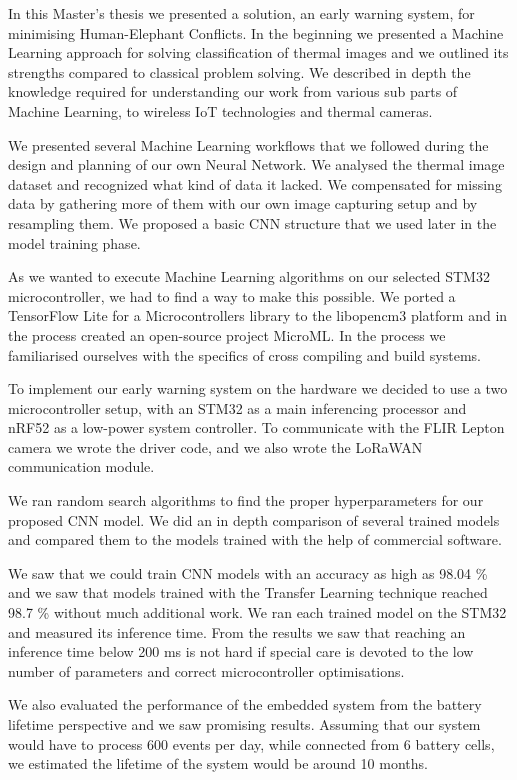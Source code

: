 In this Master's thesis we presented a solution, an early warning system, for minimising Human-Elephant Conflicts.
In the beginning we presented a Machine Learning approach for solving classification of thermal images and we outlined its strengths compared to classical problem solving.
We described in depth the knowledge required for understanding our work from various sub parts of Machine Learning, to wireless IoT technologies and thermal cameras.

We presented several Machine Learning workflows that we followed during the design and planning of our own Neural Network.
We analysed the thermal image dataset and recognized what kind of data it lacked. 
We compensated for missing data by gathering more of them with our own image capturing setup and by resampling them.
We proposed a basic CNN structure that we used later in the model training phase.

As we wanted to execute Machine Learning algorithms on our selected STM32 microcontroller, we had to find a way to make this possible.
We ported a TensorFlow Lite for a Microcontrollers library to the libopencm3 platform and in the process created an open-source project MicroML.
In the process we familiarised ourselves with the specifics of cross compiling and build systems.

To implement our early warning system on the hardware we decided to use a two microcontroller setup, with an STM32 as a main inferencing processor and nRF52 as a low-power system controller.
To communicate with the FLIR Lepton camera we wrote the driver code, and we also wrote the LoRaWAN communication module.

We ran random search algorithms to find the proper hyperparameters for our proposed CNN model.
We did an in depth comparison of several trained models and compared them to the models trained with the help of commercial software.

We saw that we could train CNN models with an accuracy as high as 98.04 \% and we saw that models trained with the Transfer Learning technique reached 98.7 \% without much additional work.
We ran each trained model on the STM32 and measured its inference time.
From the results we saw that reaching an inference time below 200 \si{\milli\second} is not hard if special care is devoted to the low number of parameters and correct microcontroller optimisations.

We also evaluated the performance of the embedded system from the battery lifetime perspective and we saw promising results.
Assuming that our system would have to process 600 events per day, while connected from 6 battery cells, we estimated the lifetime of the system would be around 10 months.

